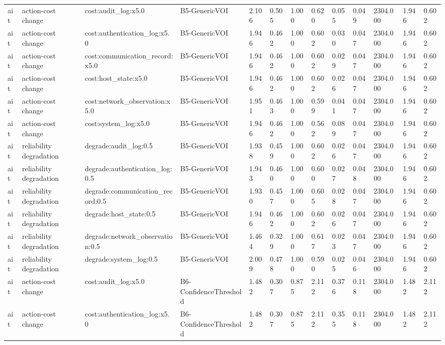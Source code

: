 \begin{table}[!ht]
{\begin{tabular}{lllllllllllll}
ait & action-cost change & cost:audit\_log:x5.0 & B5-GenericVOI & 2.106 & 0.505 & 1.000 & 0.620 & 0.055 & 0.049 & 2304.000 & 1.946 & 0.602 \\
ait & action-cost change & cost:authentication\_log:x5.0 & B5-GenericVOI & 1.946 & 0.462 & 1.000 & 0.602 & 0.030 & 0.047 & 2304.000 & 1.946 & 0.602 \\
ait & action-cost change & cost:communication\_record:x5.0 & B5-GenericVOI & 1.946 & 0.462 & 1.000 & 0.602 & 0.029 & 0.047 & 2304.000 & 1.946 & 0.602 \\
ait & action-cost change & cost:host\_state:x5.0 & B5-GenericVOI & 1.946 & 0.462 & 1.000 & 0.602 & 0.026 & 0.047 & 2304.000 & 1.946 & 0.602 \\
ait & action-cost change & cost:network\_observation:x5.0 & B5-GenericVOI & 1.951 & 0.463 & 1.000 & 0.599 & 0.041 & 0.047 & 2304.000 & 1.946 & 0.602 \\
ait & action-cost change & cost:system\_log:x5.0 & B5-GenericVOI & 1.946 & 0.462 & 1.000 & 0.562 & 0.089 & 0.047 & 2304.000 & 1.946 & 0.602 \\
ait & reliability degradation & degrade:audit\_log:0.5 & B5-GenericVOI & 1.938 & 0.459 & 1.000 & 0.602 & 0.026 & 0.047 & 2304.000 & 1.946 & 0.602 \\
ait & reliability degradation & degrade:authentication\_log:0.5 & B5-GenericVOI & 1.943 & 0.460 & 1.000 & 0.600 & 0.027 & 0.048 & 2304.000 & 1.946 & 0.602 \\
ait & reliability degradation & degrade:communication\_record:0.5 & B5-GenericVOI & 1.930 & 0.457 & 1.000 & 0.605 & 0.028 & 0.047 & 2304.000 & 1.946 & 0.602 \\
ait & reliability degradation & degrade:host\_state:0.5 & B5-GenericVOI & 1.946 & 0.462 & 1.000 & 0.602 & 0.026 & 0.047 & 2304.000 & 1.946 & 0.602 \\
ait & reliability degradation & degrade:network\_observation:0.5 & B5-GenericVOI & 1.464 & 0.329 & 1.000 & 0.617 & 0.023 & 0.047 & 2304.000 & 1.946 & 0.602 \\
ait & reliability degradation & degrade:system\_log:0.5 & B5-GenericVOI & 2.009 & 0.478 & 1.000 & 0.590 & 0.025 & 0.046 & 2304.000 & 1.946 & 0.602 \\
ait & action-cost change & cost:audit\_log:x5.0 & B6-ConfidenceThreshold & 1.482 & 0.307 & 0.875 & 2.112 & 0.376 & 0.118 & 2304.000 & 1.482 & 2.112 \\
ait & action-cost change & cost:authentication\_log:x5.0 & B6-ConfidenceThreshold & 1.482 & 0.307 & 0.875 & 2.112 & 0.355 & 0.118 & 2304.000 & 1.482 & 2.112 \\

\end{tabular}}
\end{table}
